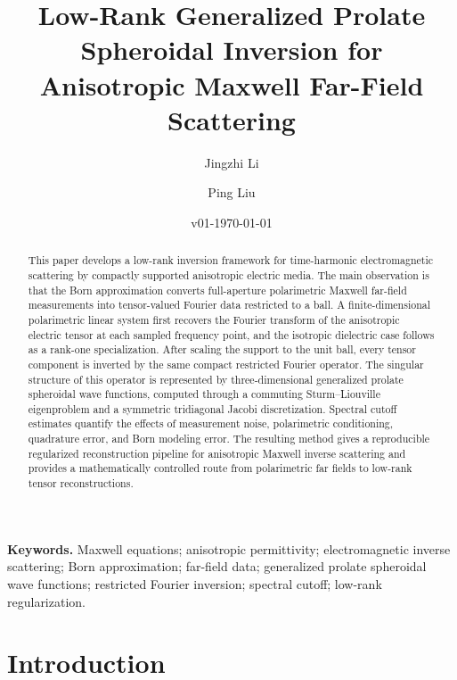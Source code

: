 \documentclass[11pt]{article}
\title{Low-Rank Generalized Prolate Spheroidal Inversion for Anisotropic Maxwell Far-Field Scattering}
\author{Jingzhi Li \and Ping Liu}
\date{v01-\today}
\numberwithin{equation}{section}
\theoremstyle{plain}
\theoremstyle{definition}
\begin{document}
\maketitle

\begin{abstract}
This paper develops a low-rank inversion framework for time-harmonic electromagnetic scattering by compactly supported anisotropic electric media.  The main observation is that the Born approximation converts full-aperture polarimetric Maxwell far-field measurements into tensor-valued Fourier data restricted to a ball.  A finite-dimensional polarimetric linear system first recovers the Fourier transform of the anisotropic electric tensor at each sampled frequency point, and the isotropic dielectric case follows as a rank-one specialization.  After scaling the support to the unit ball, every tensor component is inverted by the same compact restricted Fourier operator.  The singular structure of this operator is represented by three-dimensional generalized prolate spheroidal wave functions, computed through a commuting Sturm--Liouville eigenproblem and a symmetric tridiagonal Jacobi discretization.  Spectral cutoff estimates quantify the effects of measurement noise, polarimetric conditioning, quadrature error, and Born modeling error.  The resulting method gives a reproducible regularized reconstruction pipeline for anisotropic Maxwell inverse scattering and provides a mathematically controlled route from polarimetric far fields to low-rank tensor reconstructions.
\end{abstract}


\noindent\textbf{Keywords.} Maxwell equations; anisotropic permittivity; electromagnetic inverse scattering; Born approximation; far-field data; generalized prolate spheroidal wave functions; restricted Fourier inversion; spectral cutoff; low-rank regularization.

\tableofcontents


\section{Introduction}
\end{document}
